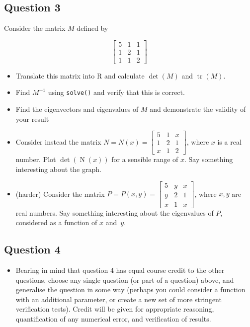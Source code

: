 \documentclass[nojss]{jss}\usepackage[]{graphicx}\usepackage[]{color}
\begin{document}
\subsection*{Question 3}
 
Consider the matrix $M$ defined by


\[
\begin{bmatrix}
  5&1&1\\
  1&2&1\\
  1&1&2
  \end{bmatrix}
\]


\begin{itemize}
\item Translate this matrix into R and calculate $\operatorname{det}\left(M\right)$ and $\operatorname{tr}\left(M\right)$. 
\item Find $M^{-1}$ using {\tt solve()} and verify that this is correct.
\item Find the eigenvectors and eigenvalues of $M$ and demonstrate the validity of your result
\item Consider instead the matrix $N=N(x)=\begin{bmatrix}
  5&1&x\\
  1&2&1\\
  x&1&2
  \end{bmatrix}$, where $x$ is a real number.  Plot $\operatorname{det}\left(\operatorname{N}(x)\right)$  for a sensible range of $x$.  Say something interesting about the graph.  
  \item  (harder) Consider the matrix $P=P(x,y)=\begin{bmatrix}
  5&y&x\\
  y&2&1\\
  x&1&x
  \end{bmatrix}$, where $x,y$ are real numbers.  Say something interesting about the eigenvalues of $P$, considered as a function of $x$ and~$y$.
\end{itemize} 

\subsection*{Question 4}

\begin{itemize}
  \item 
    Bearing in mind that question 4 has equal course credit to the
    other questions, choose any single question (or part of a
    question) above, and generalise the question in some way (perhaps
    you could consider a function with an additional parameter, or
    create a new set of more stringent verification tests).  Credit
    will be given for appropriate reasoning, quantification of any
    numerical error, and verification of results.
    \end{itemize}


 
\end{document}
